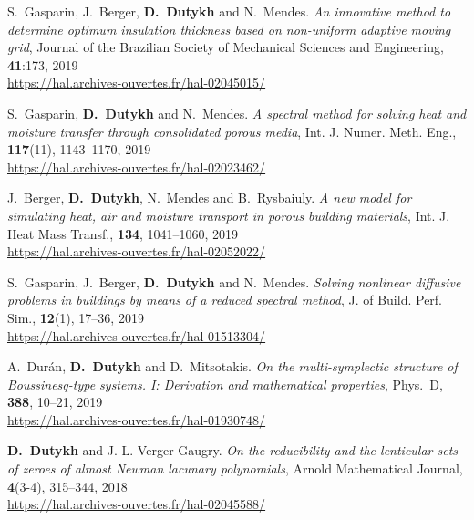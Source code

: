 \begin{etaremune}
  \item S.~Gasparin, J.~Berger, \textbf{D.~Dutykh} and N.~Mendes. \textit{An innovative method to determine optimum insulation thickness based on non-uniform adaptive moving grid}, Journal of the Brazilian Society of Mechanical Sciences and Engineering, \textbf{41}:173, 2019 \\ %
  \url{https://hal.archives-ouvertes.fr/hal-02045015/}
  
  \item S.~Gasparin, \textbf{D.~Dutykh} and N.~Mendes. \textit{A spectral method for solving heat and moisture transfer through consolidated porous media}, Int. J. Numer. Meth. Eng., \textbf{117}(11), 1143--1170, 2019 \\ %
  \url{https://hal.archives-ouvertes.fr/hal-02023462/}
  
  \item J.~Berger, \textbf{D.~Dutykh}, N.~Mendes and B.~Rysbaiuly. \textit{A new model for simulating heat, air and moisture transport in porous building materials}, Int. J. Heat Mass Transf., \textbf{134}, 1041--1060, 2019 \\ %
  \url{https://hal.archives-ouvertes.fr/hal-02052022/}
  
  \item S.~Gasparin, J.~Berger, \textbf{D.~Dutykh} and N.~Mendes. \textit{Solving nonlinear diffusive problems in buildings by means of a reduced spectral method}, J. of Build. Perf. Sim., \textbf{12}(1), 17--36, 2019 \\ %
  \url{https://hal.archives-ouvertes.fr/hal-01513304/}
  
  \item A.~Dur\'an, \textbf{D.~Dutykh} and D.~Mitsotakis. \textit{On the multi-symplectic structure of Boussinesq-type systems. I: Derivation and mathematical properties}, Phys.~D, \textbf{388}, 10--21, 2019 \\ %
  \url{https://hal.archives-ouvertes.fr/hal-01930748/}

  
  \item \textbf{D.~Dutykh} and J.-L. Verger-Gaugry. \textit{On the reducibility and the lenticular sets of zeroes of almost Newman lacunary polynomials}, Arnold Mathematical Journal, \textbf{4}(3-4), 315--344, 2018 \\ %
  \url{https://hal.archives-ouvertes.fr/hal-02045588/}
  

\end{etaremune}
